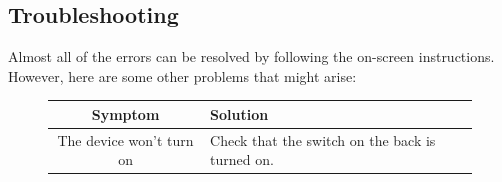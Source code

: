 \documentclass[12pt,a4paper,landscape]{article}
\begin{document}
\begin{multicols}{2}
		\subsection*{Troubleshooting}
		Almost all of the errors can be resolved by following the on-screen instructions. However, here are some other problems that might arise:
		\begin{figure}[H]
			\centering
			\begin{tabular}{|c|p{5cm}|}
				\hline
				Symptom & Solution\\
				\hline
				The device won't turn on & Check that the switch on the back is turned on.\\
				\hline
			\end{tabular}
		\end{figure}
	\end{multicols}

\vspace{2cm}

\newpage
{}
\end{document}
